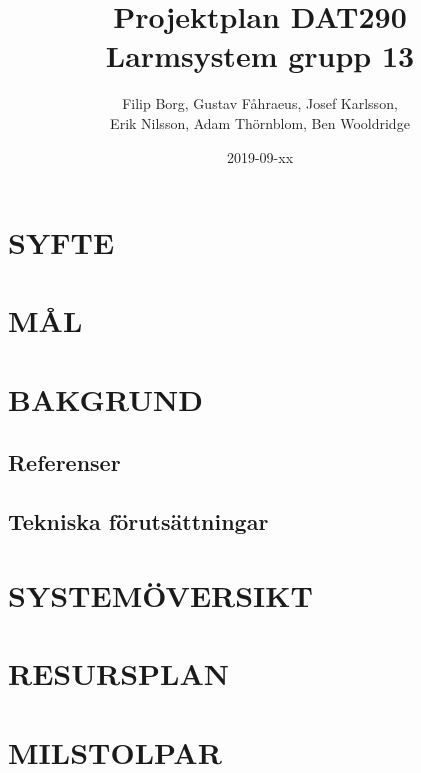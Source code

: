 \documentclass[a4paper]{article}
\title{Projektplan DAT290 \\ \Large Larmsystem grupp 13}
\author{Filip Borg, Gustav Fåhraeus, Josef Karlsson,\\
            Erik Nilsson, Adam Thörnblom, Ben Wooldridge}
\date{2019-09-xx}
\begin{document}
\maketitle
{}
\newpage

\tableofcontents
\newpage



\section{SYFTE}
\label{sec:syfte}



\section{MÅL}
\label{sec:mål}



\section{BAKGRUND}
\label{sec:bakgrund}



\subsection{Referenser}
\label{sec:referenser}



\subsection{Tekniska förutsättningar}
\label{sec:tekniskaf}



\section{SYSTEMÖVERSIKT}
\label{sec:systemö}



\section{RESURSPLAN}
\label{sec:resurs}



\section{MILSTOLPAR}
\label{sec:milstolpar}
\end{document}

